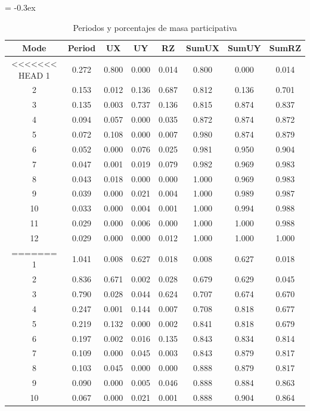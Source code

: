 \documentclass{article}%
\begin{document}
\begin{table}[h!]%
\extrarowheight = -0.3ex%
\renewcommand{\arraystretch}{1.3}%
\centering%
\caption{Periodos y porcentajes de masa participativa}%
\begin{tabular}{cccccccc}
\toprule
Mode & Period & UX & UY & RZ & SumUX & SumUY & SumRZ \\
\midrule
<<<<<<< HEAD
1 & 0.272 & 0.800 & 0.000 & 0.014 & 0.800 & 0.000 & 0.014 \\
2 & 0.153 & 0.012 & 0.136 & 0.687 & 0.812 & 0.136 & 0.701 \\
3 & 0.135 & 0.003 & 0.737 & 0.136 & 0.815 & 0.874 & 0.837 \\
4 & 0.094 & 0.057 & 0.000 & 0.035 & 0.872 & 0.874 & 0.872 \\
5 & 0.072 & 0.108 & 0.000 & 0.007 & 0.980 & 0.874 & 0.879 \\
6 & 0.052 & 0.000 & 0.076 & 0.025 & 0.981 & 0.950 & 0.904 \\
7 & 0.047 & 0.001 & 0.019 & 0.079 & 0.982 & 0.969 & 0.983 \\
8 & 0.043 & 0.018 & 0.000 & 0.000 & 1.000 & 0.969 & 0.983 \\
9 & 0.039 & 0.000 & 0.021 & 0.004 & 1.000 & 0.989 & 0.987 \\
10 & 0.033 & 0.000 & 0.004 & 0.001 & 1.000 & 0.994 & 0.988 \\
11 & 0.029 & 0.000 & 0.006 & 0.000 & 1.000 & 1.000 & 0.988 \\
12 & 0.029 & 0.000 & 0.000 & 0.012 & 1.000 & 1.000 & 1.000 \\
=======
1 & 1.041 & 0.008 & 0.627 & 0.018 & 0.008 & 0.627 & 0.018 \\
2 & 0.836 & 0.671 & 0.002 & 0.028 & 0.679 & 0.629 & 0.045 \\
3 & 0.790 & 0.028 & 0.044 & 0.624 & 0.707 & 0.674 & 0.670 \\
4 & 0.247 & 0.001 & 0.144 & 0.007 & 0.708 & 0.818 & 0.677 \\
5 & 0.219 & 0.132 & 0.000 & 0.002 & 0.841 & 0.818 & 0.679 \\
6 & 0.197 & 0.002 & 0.016 & 0.135 & 0.843 & 0.834 & 0.814 \\
7 & 0.109 & 0.000 & 0.045 & 0.003 & 0.843 & 0.879 & 0.817 \\
8 & 0.103 & 0.045 & 0.000 & 0.000 & 0.888 & 0.879 & 0.817 \\
9 & 0.090 & 0.000 & 0.005 & 0.046 & 0.888 & 0.884 & 0.863 \\
10 & 0.067 & 0.000 & 0.021 & 0.001 & 0.888 & 0.904 & 0.864 \\

\end{tabular}
\end{table}
\end{document}
